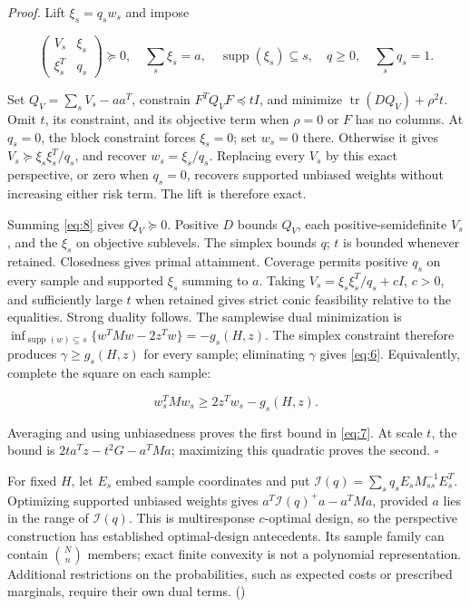 \documentclass[11pt]{article}
\begin{document}
\emph{Proof.} Lift \(\xi_s=q_sw_s\) and impose

\begin{equation}\label{eq:8}
\begin{pmatrix}V_s&\xi_s\\\xi_s^T&q_s\end{pmatrix}\succeq0,
\quad \sum_s\xi_s=a,\quad \operatorname{supp}(\xi_s)\subseteq s,
\quad q\ge0,\quad \sum_sq_s=1. 
\end{equation}

Set \(Q_V=\sum_sV_s-aa^T\), constrain \(F^TQ_VF\preceq tI\), and
minimize \(\operatorname{tr}(DQ_V)+\rho^2t\). Omit \(t\), its
constraint, and its objective term when \(\rho=0\) or \(F\) has no
columns. At \(q_s=0\), the block constraint forces \(\xi_s=0\); set
\(w_s=0\) there. Otherwise it gives \(V_s\succeq \xi_s\xi_s^T/q_s\), and
recover \(w_s=\xi_s/q_s\). Replacing every \(V_s\) by this exact
perspective, or zero when \(q_s=0\), recovers supported unbiased weights
without increasing either risk term. The lift is therefore exact.

Summing \eqref{eq:8} gives \(Q_V\succeq0\). Positive \(D\) bounds
\(Q_V\), each positive-semidefinite \(V_s\), and the \(\xi_s\) on
objective sublevels. The simplex bounds \(q\); \(t\) is bounded whenever
retained. Closedness gives primal attainment. Coverage permits positive
\(q_s\) on every sample and supported \(\xi_s\) summing to \(a\). Taking
\(V_s=\xi_s\xi_s^T/q_s+cI\), \(c>0\), and sufficiently large \(t\) when
retained gives strict conic feasibility relative to the equalities.
Strong duality follows. The samplewise dual minimization is
\(\inf_{\operatorname{supp}(w)\subseteq s}\{w^TMw-2z^Tw\}=-g_s(H,z)\).
The simplex constraint therefore produces \(\gamma\ge g_s(H,z)\) for
every sample; eliminating \(\gamma\) gives \eqref{eq:6}. Equivalently,
complete the square on each sample:

\[
w_s^TMw_s\ge 2z^Tw_s-g_s(H,z).
\]

Averaging and using unbiasedness proves the first bound in \eqref{eq:7}.
At scale \(t\), the bound is \(2t a^Tz-t^2G-a^TMa\); maximizing this
quadratic proves the second. \(\square\)

For fixed \(H\), let \(E_s\) embed sample coordinates and put
\(\mathcal I(q)=\sum_s q_sE_sM_{ss}^{-1}E_s^T\). Optimizing supported
unbiased weights gives \(a^T\mathcal I(q)^+a-a^TMa\), provided \(a\)
lies in the range of \(\mathcal I(q)\). This is multiresponse
\(c\)-optimal design, so the perspective construction has established
optimal-design antecedents. Its sample family can contain \(\binom Nn\)
members; exact finite convexity is not a polynomial representation.
Additional restrictions on the probabilities, such as expected costs or
prescribed marginals, require their own dual terms.
(\citealp[Theorems 3.3 and 4.3]{Sagnol2010})
\end{document}
